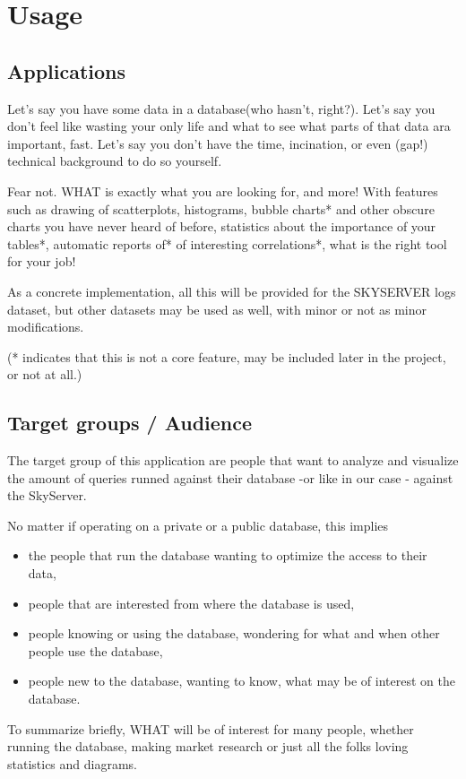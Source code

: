\section{Usage}

\subsection{Applications}
Let's say you have some data in a database(who hasn't, right?).
Let's say you don't feel like wasting your only life and what to see what parts of that data ara important, fast.
Let's say you don't have the time, incination, or even (gap!) technical background to do so yourself.

Fear not. WHAT is exactly what you are looking for, and more!
With features such as drawing of scatterplots, histograms, bubble charts* 
and other obscure charts you have never heard of before, statistics about the importance of your tables*,
automatic reports of* of interesting correlations*, what is the right tool for your job!

As a concrete implementation, all this will be provided for the SKYSERVER logs dataset, but other datasets may be
used as well, with minor or not as minor modifications.

(* indicates that this is not a core feature, may be included later in the project, or not at all.)

\subsection{Target groups / Audience}

The target group of this application are people that want to analyze 
and visualize the amount of queries runned against their database -or like
in our case - against the SkyServer.

No matter if operating on a private or a public database, this implies
\begin{itemize}
  \item the people that run the database wanting to optimize the access to
  	their data,
  	
  \item people that are interested from where the database is used,

  \item people knowing or using the database, wondering for what and when other people
  use the database,
  
  \item people new to the database, wanting to know, what may be of interest
  on the database.

\end{itemize}
To summarize briefly, WHAT will be of interest for many people, 
whether running the database, making market research or just all the folks
loving statistics and diagrams.

